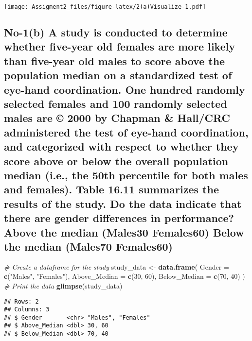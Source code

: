 \documentclass[
]{article}
\newenvironment{Shaded}{\begin{snugshade}}{\end{snugshade}}
\newcommand{\AttributeTok}[1]{\textcolor[rgb]{0.13,0.29,0.53}{#1}}
\newcommand{\CommentTok}[1]{\textcolor[rgb]{0.56,0.35,0.01}{\textit{#1}}}
\newcommand{\DecValTok}[1]{\textcolor[rgb]{0.00,0.00,0.81}{#1}}
\newcommand{\FunctionTok}[1]{\textcolor[rgb]{0.13,0.29,0.53}{\textbf{#1}}}
\newcommand{\NormalTok}[1]{#1}
\newcommand{\OtherTok}[1]{\textcolor[rgb]{0.56,0.35,0.01}{#1}}
\newcommand{\StringTok}[1]{\textcolor[rgb]{0.31,0.60,0.02}{#1}}
\begin{document}
\texttt{[image: Assigment2\_files/figure-latex/2(a)Visualize-1.pdf]}

\subsection{No-1(b) A study is conducted to determine whether five-year
old females are more likely than five-year old males to score above the
population median on a standardized test of eye-hand coordination. One
hundred randomly selected females and 100 randomly selected males are ©
2000 by Chapman \& Hall/CRC administered the test of eye-hand
coordination, and categorized with respect to whether they score above
or below the overall population median (i.e., the 50th percentile for
both males and females). Table 16.11 summarizes the results of the
study. Do the data indicate that there are gender differences in
performance? Above the median (Males30 Females60) Below the median
(Males70
Females60)}\label{no-1b-a-study-is-conducted-to-determine-whether-five-year-old-females-are-more-likely-than-five-year-old-males-to-score-above-the-population-median-on-a-standardized-test-of-eye-hand-coordination.-one-hundred-randomly-selected-females-and-100-randomly-selected-males-are-2000-by-chapman-hallcrc-administered-the-test-of-eye-hand-coordination-and-categorized-with-respect-to-whether-they-score-above-or-below-the-overall-population-median-i.e.-the-50th-percentile-for-both-males-and-females.-table-16.11-summarizes-the-results-of-the-study.-do-the-data-indicate-that-there-are-gender-differences-in-performance-above-the-median-males30-females60-below-the-median-males70-females60}

\begin{Shaded}
\begin{Highlighting}[]
\CommentTok{\# Create a dataframe for the study}
\NormalTok{study\_data }\OtherTok{\textless{}{-}} \FunctionTok{data.frame}\NormalTok{(}
  \AttributeTok{Gender =} \FunctionTok{c}\NormalTok{(}\StringTok{"Males"}\NormalTok{, }\StringTok{"Females"}\NormalTok{),}
  \AttributeTok{Above\_Median =} \FunctionTok{c}\NormalTok{(}\DecValTok{30}\NormalTok{, }\DecValTok{60}\NormalTok{),}
  \AttributeTok{Below\_Median =} \FunctionTok{c}\NormalTok{(}\DecValTok{70}\NormalTok{, }\DecValTok{40}\NormalTok{)}
\NormalTok{)}
\CommentTok{\# Print the data}
\FunctionTok{glimpse}\NormalTok{(study\_data)}
\end{Highlighting}
\end{Shaded}

\begin{verbatim}
## Rows: 2
## Columns: 3
## $ Gender       <chr> "Males", "Females"
## $ Above_Median <dbl> 30, 60
## $ Below_Median <dbl> 70, 40
\end{verbatim}
\end{document}
